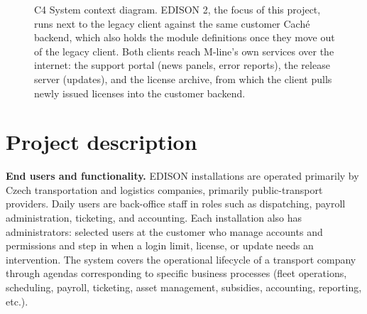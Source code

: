 \documentclass{article}
\begin{document}
\begin{figure}[tb]
\caption{C4 System context diagram. EDISON 2, the focus of this project, runs next to the legacy client against the same customer Caché backend, which also holds the module definitions once they move out of the legacy client. Both clients reach M-line's own services over the internet: the support portal (news panels, error reports), the release server (updates), and the license archive, from which the client pulls newly issued licenses into the customer backend.}
\label{fig:c4-context}
\end{figure}

\section{Project description}
\label{sec:description}

\textbf{End users and functionality.} EDISON installations are operated primarily by Czech transportation and logistics companies, primarily public-transport providers. Daily users are back-office staff in roles such as dispatching, payroll administration, ticketing, and accounting. Each installation also has administrators: selected users at the customer who manage accounts and permissions and step in when a login limit, license, or update needs an intervention. The system covers the operational lifecycle of a transport company through agendas corresponding to specific business processes (fleet operations, scheduling, payroll, ticketing, asset management, subsidies, accounting, reporting, etc.).
\end{document}

